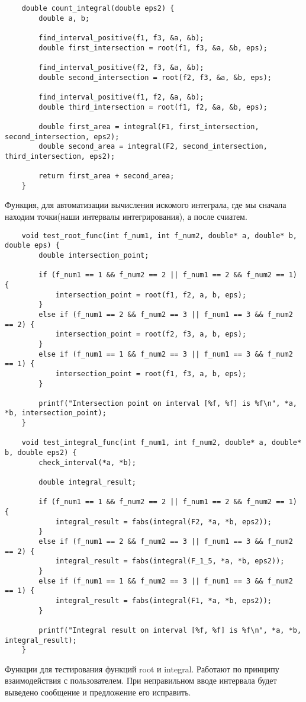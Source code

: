 \documentclass[a4paper,12pt,titlepage,finall]{article}
\begin{document}
\begin{verbatim}
    double count_integral(double eps2) {
        double a, b;
    
        find_interval_positive(f1, f3, &a, &b);
        double first_intersection = root(f1, f3, &a, &b, eps);
    
        find_interval_positive(f2, f3, &a, &b);
        double second_intersection = root(f2, f3, &a, &b, eps);
    
        find_interval_positive(f1, f2, &a, &b);
        double third_intersection = root(f1, f2, &a, &b, eps);
    
        double first_area = integral(F1, first_intersection, second_intersection, eps2);
        double second_area = integral(F2, second_intersection, third_intersection, eps2);
    
        return first_area + second_area;
    }    
\end{verbatim}
Функция, для автоматизации вычисления искомого интеграла, где мы сначала находим точки(наши интервалы интегрирования), а после счиатем.


\begin{verbatim}
    void test_root_func(int f_num1, int f_num2, double* a, double* b, double eps) {
        double intersection_point;
    
        if (f_num1 == 1 && f_num2 == 2 || f_num1 == 2 && f_num2 == 1) {
            intersection_point = root(f1, f2, a, b, eps);
        }
        else if (f_num1 == 2 && f_num2 == 3 || f_num1 == 3 && f_num2 == 2) {
            intersection_point = root(f2, f3, a, b, eps);
        }
        else if (f_num1 == 1 && f_num2 == 3 || f_num1 == 3 && f_num2 == 1) {
            intersection_point = root(f1, f3, a, b, eps);
        }
    
        printf("Intersection point on interval [%f, %f] is %f\n", *a, *b, intersection_point);
    }
    
    void test_integral_func(int f_num1, int f_num2, double* a, double* b, double eps2) {
        check_interval(*a, *b);
    
        double integral_result;
    
        if (f_num1 == 1 && f_num2 == 2 || f_num1 == 2 && f_num2 == 1) {
            integral_result = fabs(integral(F2, *a, *b, eps2));
        }
        else if (f_num1 == 2 && f_num2 == 3 || f_num1 == 3 && f_num2 == 2) {
            integral_result = fabs(integral(F_1_5, *a, *b, eps2));
        }
        else if (f_num1 == 1 && f_num2 == 3 || f_num1 == 3 && f_num2 == 1) {
            integral_result = fabs(integral(F1, *a, *b, eps2));
        }
    
        printf("Integral result on interval [%f, %f] is %f\n", *a, *b, integral_result);
    }
\end{verbatim}
Функции для тестирования функций root и integral. Работают по принципу взаимодействия с пользователем.
При неправильном вводе интервала будет выведено сообщение и предложение его исправить.
\end{document}
